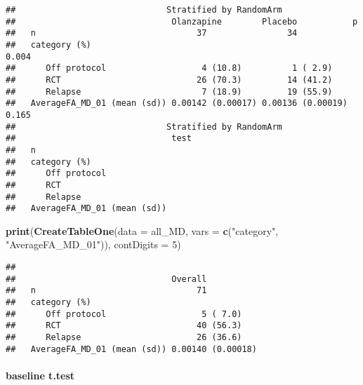 \documentclass[]{article}
\newenvironment{Shaded}{\begin{snugshade}}{\end{snugshade}}
\newcommand{\KeywordTok}[1]{\textcolor[rgb]{0.13,0.29,0.53}{\textbf{#1}}}
\newcommand{\DataTypeTok}[1]{\textcolor[rgb]{0.13,0.29,0.53}{#1}}
\newcommand{\DecValTok}[1]{\textcolor[rgb]{0.00,0.00,0.81}{#1}}
\newcommand{\StringTok}[1]{\textcolor[rgb]{0.31,0.60,0.02}{#1}}
\newcommand{\NormalTok}[1]{#1}
\let\oldparagraph\paragraph
\renewcommand{\paragraph}[1]{\oldparagraph{#1}\mbox{}}
\theoremstyle{definition}
\theoremstyle{definition}
\theoremstyle{definition}
\theoremstyle{remark}
\begin{document}
\begin{verbatim}
##                              Stratified by RandomArm
##                               Olanzapine        Placebo           p     
##   n                                37                34                 
##   category (%)                                                     0.004
##      Off protocol                   4 (10.8)          1 ( 2.9)          
##      RCT                           26 (70.3)         14 (41.2)          
##      Relapse                        7 (18.9)         19 (55.9)          
##   AverageFA_MD_01 (mean (sd)) 0.00142 (0.00017) 0.00136 (0.00019)  0.165
##                              Stratified by RandomArm
##                               test
##   n                               
##   category (%)                    
##      Off protocol                 
##      RCT                          
##      Relapse                      
##   AverageFA_MD_01 (mean (sd))
\end{verbatim}

\begin{Shaded}
\begin{Highlighting}[]
\KeywordTok{print}\NormalTok{(}\KeywordTok{CreateTableOne}\NormalTok{(}\DataTypeTok{data =}\NormalTok{ all_MD,}
               \DataTypeTok{vars =} \KeywordTok{c}\NormalTok{(}\StringTok{"category"}\NormalTok{, }\StringTok{"AverageFA_MD_01"}\NormalTok{)), }\DataTypeTok{contDigits =} \DecValTok{5}\NormalTok{)}
\end{Highlighting}
\end{Shaded}

\begin{verbatim}
##                              
##                               Overall          
##   n                                71          
##   category (%)                                 
##      Off protocol                   5 ( 7.0)   
##      RCT                           40 (56.3)   
##      Relapse                       26 (36.6)   
##   AverageFA_MD_01 (mean (sd)) 0.00140 (0.00018)
\end{verbatim}

\paragraph{baseline t.test}\label{baseline-t.test-1}
\end{document}
